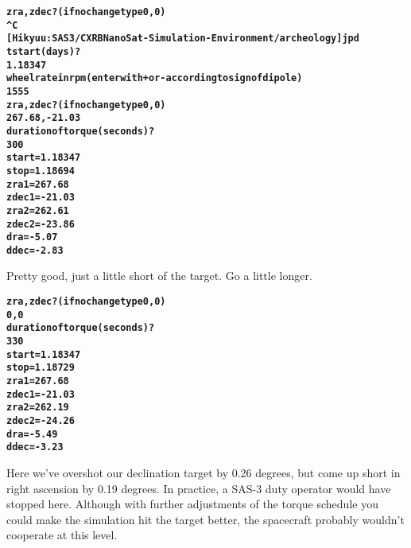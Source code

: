\documentclass[11pt]{article}
\begin{document}
\begin{alltt}
\bfseries
       zra,zdec? (if no change type 0,0)
^C
[Hikyuu:SAS3/CXRBNanoSat-Simulation-Environment/archeology] jpd% ./newmagnav
      tstart (days)?
1.18347
      wheel rate in rpm (enter with + or - according to sign of dipole)
1555
      zra,zdec? (if no change type 0,0)
267.68,-21.03
      duration of torque (seconds)?
300
 start=     1.18347
 stop=     1.18694
 zra1= 267.68
 zdec1= -21.03
 zra2= 262.61
 zdec2= -23.86
 dra=  -5.07
 ddec=  -2.83
\end{alltt}

Pretty good, just a little short of the target. Go a little longer.

\begin{alltt}
\bfseries
      zra,zdec? (if no change type 0,0)
0,0
      duration of torque (seconds)?
330
 start=     1.18347
 stop=     1.18729
 zra1= 267.68
 zdec1= -21.03
 zra2= 262.19
 zdec2= -24.26
 dra=  -5.49
 ddec=  -3.23
\end{alltt}

Here we've overshot our declination target by 0.26 degrees, but come up short in right ascension by 0.19 degrees. In practice, a SAS-3 duty operator would have stopped here. Although with further adjustments of the torque schedule you could make the simulation hit the target better, the spacecraft probably wouldn't cooperate at this level.


 
\end{document}
